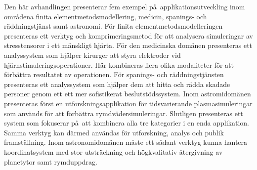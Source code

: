 Den h\"ar avhandlingen presenterar fem exempel p\aa\ applikationsutveckling inom omr\aa dena finita elementmetodsmodellering, medicin, spanings- och r\"addningstj\"anst samt astronomi.  F\"or finita elementmetodsmodelleringen presenteras ett verktyg och komprimeringsmetod  f\"or att analysera simuleringar av stresstensorer i ett m\"anskligt hj\"arta.  F\"or den medicinska dom\"anen presenteras ett analyssystem som hj\"alper kirurger att styra elektroder vid hj\"arnstimuleringsoperationer.  H\"ar kombineras flera olika modaliteter f\"or att f\"orb\"attra resultatet av operationen.  F\"or spanings- och r\"addningstj\"ansten presenteras ett analyssystem som hj\"alper dem att hitta och r\"adda skadade personer genom ett ett mer sofistikerat beslutst\"odssystem.  Inom astromidom\"anen presenteras f\"orst en utforskningsapplikation f\"or tidsvarierande plasmasimuleringar som anv\"ands f\"or att f\"orb\"attra rymdv\"adersimuleringar.  Slutligen presenteras ett system som fokuserar p\aa\ att kombinera alla tre kategorier i en enda applikation.  Samma verktyg kan d\"armed anv\"andas f\"or utforskning, analys och publik framst\"allning.  Inom astronomidom\"anen m\aa ste ett s\aa dant verktyg kunna hantera koordinatsystem med stor utstr\"ackning och h\"ogkvalitativ \aa tergivning av planetytor samt rymduppdrag.
